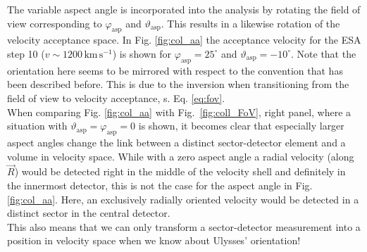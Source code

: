 %
%
%
The variable aspect angle is incorporated into the analysis by rotating the field of view corresponding to $\varphi_{\mathrm{asp}}$ and $\vartheta_{\mathrm{asp}}$. This results in a likewise rotation of the velocity acceptance space. In Fig. \ref{fig:col_aa} the acceptance velocity for the ESA step 10 ($v \sim 1200 \,\mathrm{km\,s^{-1}}$) is shown for $\varphi_\mathrm{asp} = 25^\circ$ and $\vartheta_{\mathrm{asp}} = -10^\circ $. Note that the orientation here seems to be mirrored with respect to the convention that has been described before. This is due to the inversion when transitioning from the field of view to velocity acceptance, s. Eq. \ref{eq:fov}.\\
When comparing Fig. \ref{fig:col_aa} with Fig.~\ref{fig:coll_FoV}, right panel, where a situation with $\vartheta_{\mathrm{asp}} = \varphi_{\mathrm{asp}} = 0$ is shown, it becomes clear that especially larger aspect angles change the link between a distinct sector-detector element and a volume in velocity space. While with a zero aspect angle a radial velocity (along $\vec{R}$) would be detected right in the middle of the velocity shell and definitely in the innermost detector, this is not the case for the aspect angle in Fig. \ref{fig:col_aa}. Here, an exclusively radially oriented velocity would be detected in a distinct sector in the central detector.\\
This also means that we can only transform a sector-detector measurement into a position in velocity space when we know about Ulysses' orientation!
